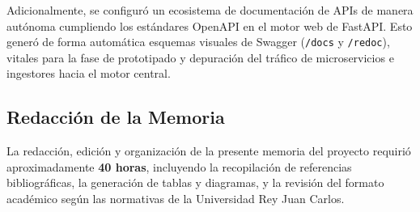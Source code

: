 Adicionalmente, se configuró un ecosistema de documentación de APIs de manera autónoma cumpliendo los estándares OpenAPI en el motor web de FastAPI. Esto generó de forma automática esquemas visuales de Swagger (\texttt{/docs} y \texttt{/redoc}), vitales para la fase de prototipado y depuración del tráfico de microservicios e ingestores hacia el motor central.

\subsection{Redacción de la Memoria}
La redacción, edición y organización de la presente memoria del proyecto requirió aproximadamente \textbf{40 horas}, incluyendo la recopilación de referencias bibliográficas, la generación de tablas y diagramas, y la revisión del formato académico según las normativas de la Universidad Rey Juan Carlos.
